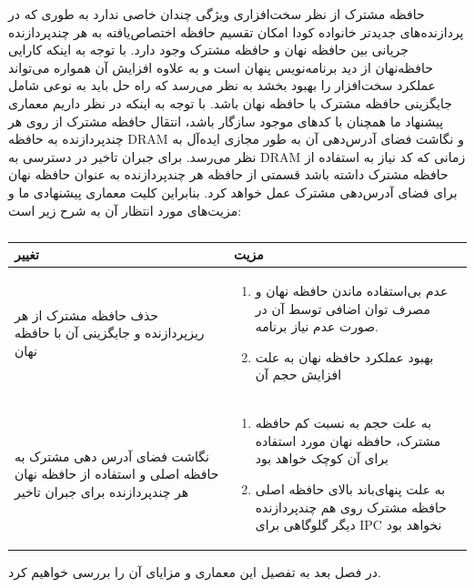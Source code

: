 \documentclass{thesis}
\begin{document}
حافظه مشترک از نظر سخت‌افزاری ویژگی چندان خاصی ندارد به‌ طوری‌ که در
پردازنده‌های
جدیدتر
خانواده کودا امکان تقسیم حافظه
اختصاص‌یافته به هر چندپردازنده جریانی بین حافظه نهان و حافظه مشترک وجود دارد. 
با توجه به اینکه کارایی حافظه‌نهان از دید برنامه‌نویس پنهان
است
و به علاوه افزایش آن همواره می‌تواند عملکرد سخت‌افزار را بهبود بخشد به ‌نظر
می‌رسد که راه حل باید به نوعی شامل جایگزینی حافظه مشترک با حافظه نهان باشد. با
توجه به اینکه در نظر داریم معماری پیشنهاد ما همچنان با کد‌های موجود سازگار
باشد، انتقال حافظه مشترک از روی هر چندپردازنده به حافظه
DRAM
و نگاشت فضای آدرس‌دهی آن به طور مجازی ایده‌آل به نظر می‌رسد.
برای جبران تاخیر در دسترسی به
DRAM
زمانی که کد نیاز به استفاده از حافظه مشترک داشته باشد قسمتی از حافظه هر
چندپردازنده به عنوان حافظه نهان برای فضای آدرس‌دهی مشترک عمل خواهد کرد.
بنابراین کلیت معماری پیشنهادی ما و مزیت‌های مورد انتظار آن به شرح زیر است:

\begin{center}
\begin{table}[h!]
\begin{tabular}{|p{}|p{}|}
\hline
تغییر
&
مزیت
\\
\hline
حذف حافظه مشترک از هر ریزپردازنده و جایگزینی آن با حافظه نهان
&
\begin{enumerate}
\item 
عدم بی‌استفاده ماندن حافظه نهان و مصرف توان اضافی توسط آن در صورت عدم نیاز
برنامه.
\item
بهبود عملکرد حافظه نهان به علت افزایش حجم آن
\end{enumerate}
\\
\hline
نگاشت فضای آدرس دهی مشترک به حافظه اصلی و استفاده از حافظه نهان هر چندپردازنده
برای جبران تاخیر
&
\begin{enumerate}
\item
به علت حجم به نسبت کم حافظه مشترک، حافظه نهان مورد استفاده برای آن کوچک خواهد
بود
\item
به علت پنهای‌باند بالای حافظه اصلی حافظه مشترک روی هم چندپردازنده دیگر گلوگاهی
برای
IPC
نخواهد بود
\end{enumerate}
\\
\hline
\end{tabular}
\caption{%
}
\label{table:sharedmemorybenchmarks}
\end{table}
\end{center}

در فصل بعد به تفصیل این معماری و مزایای آن را بررسی خواهیم 
کرد.

\end{document}

